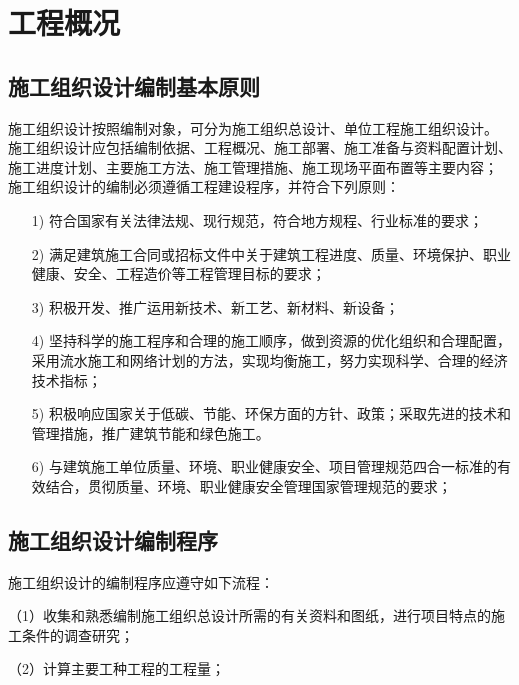 
\section{工程概况}
\subsection{施工组织设计编制基本原则}

施工组织设计按照编制对象，可分为施工组织总设计、单位工程施工组织设计。
施工组织设计应包括编制依据、工程概况、施工部署、施工准备与资料配置计划、
施工进度计划、主要施工方法、施工管理措施、施工现场平面布置等主要内容；
施工组织设计的编制必须遵循工程建设程序，并符合下列原则：

\begin{itemize}

    \item [1)] 符合国家有关法律法规、现行规范，符合地方规程、行业标准的要求；

    \item [2)] 满足建筑施工合同或招标文件中关于建筑工程进度、质量、环境保护、职业健康、安全、工程造价等工程管理目标的要求；

    \item [3)] 积极开发、推广运用新技术、新工艺、新材料、新设备；

    \item [4)] 坚持科学的施工程序和合理的施工顺序，做到资源的优化组织和合理配置，采用流水施工和网络计划的方法，实现均衡施工，努力实现科学、合理的经济技术指标；

    \item [5)] 积极响应国家关于低碳、节能、环保方面的方针、政策；采取先进的技术和管理措施，推广建筑节能和绿色施工。

    \item [6)] 与建筑施工单位质量、环境、职业健康安全、项目管理规范四合一标准的有效结合，贯彻质量、环境、职业健康安全管理国家管理规范的要求；

\end{itemize}

\subsection{施工组织设计编制程序}

施工组织设计的编制程序应遵守如下流程：

（1）收集和熟悉编制施工组织总设计所需的有关资料和图纸，进行项目特点的施工条件的调查研究；

（2）计算主要工种工程的工程量；

